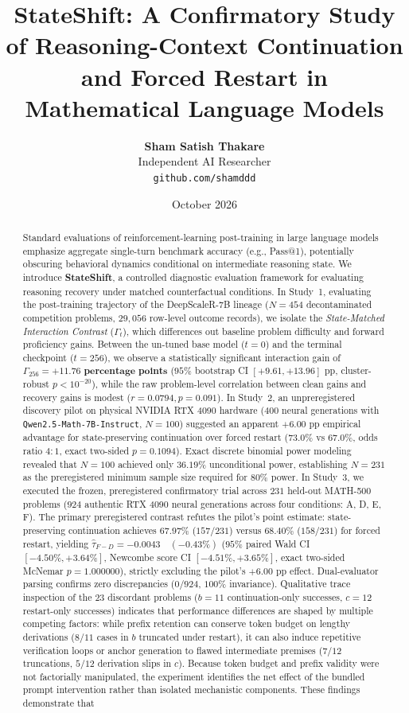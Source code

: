\documentclass[11pt]{article}
\title{\textbf{StateShift: A Confirmatory Study of Reasoning-Context Continuation\\and Forced Restart in Mathematical Language Models}}
\author{
  \textbf{Sham Satish Thakare} \\
  Independent AI Researcher \\
  \texttt{github.com/shamddd} \\
}
\date{October 2026}
\begin{document}
\maketitle

\begin{abstract}
Standard evaluations of reinforcement-learning post-training in large language models emphasize aggregate single-turn benchmark accuracy (e.g., Pass@1), potentially obscuring behavioral dynamics conditional on intermediate reasoning state. We introduce \textbf{StateShift}, a controlled diagnostic evaluation framework for evaluating reasoning recovery under matched counterfactual conditions. In Study~1, evaluating the post-training trajectory of the DeepScaleR-7B lineage ($N=454$ decontaminated competition problems, $29,056$ row-level outcome records), we isolate the \emph{State-Matched Interaction Contrast} ($\Gamma_t$), which differences out baseline problem difficulty and forward proficiency gains. Between the un-tuned base model ($t=0$) and the terminal checkpoint ($t=256$), we observe a statistically significant interaction gain of $\Gamma_{256} = \mathbf{+11.76\text{ percentage points}}$ ($95\%$ bootstrap CI $[+9.61, +13.96]\text{ pp}$, cluster-robust $p < 10^{-20}$), while the raw problem-level correlation between clean gains and recovery gains is modest ($r = 0.0794, p = 0.091$). In Study~2, an unpreregistered discovery pilot on physical NVIDIA RTX 4090 hardware ($400$ neural generations with \texttt{Qwen2.5-Math-7B-Instruct}, $N=100$) suggested an apparent $+6.00\text{ pp}$ empirical advantage for state-preserving continuation over forced restart ($73.0\%$ vs $67.0\%$, odds ratio $4:1$, exact two-sided $p = 0.1094$). Exact discrete binomial power modeling revealed that $N=100$ achieved only $36.19\%$ unconditional power, establishing $N=231$ as the preregistered minimum sample size required for $80\%$ power. In Study~3, we executed the frozen, preregistered confirmatory trial across $231$ held-out MATH-500 problems ($924$ authentic RTX 4090 neural generations across four conditions: A, D, E, F). The primary preregistered contrast refutes the pilot's point estimate: state-preserving continuation achieves $67.97\%$ ($157/231$) versus $68.40\%$ ($158/231$) for forced restart, yielding $\hat{\tau}_{F-D} = \mathbf{-0.0043 \quad (-0.43\%)}$ ($95\%$ paired Wald CI $[-4.50\%, +3.64\%]$, Newcombe score CI $[-4.51\%, +3.65\%]$, exact two-sided McNemar $p = \mathbf{1.000000}$), strictly excluding the pilot's $+6.00\text{ pp}$ effect. Dual-evaluator parsing confirms zero discrepancies ($0/924$, $100\%$ invariance). Qualitative trace inspection of the $23$ discordant problems ($b=11$ continuation-only successes, $c=12$ restart-only successes) indicates that performance differences are shaped by multiple competing factors: while prefix retention can conserve token budget on lengthy derivations ($8/11$ cases in $b$ truncated under restart), it can also induce repetitive verification loops or anchor generation to flawed intermediate premises ($7/12$ truncations, $5/12$ derivation slips in $c$). Because token budget and prefix validity were not factorially manipulated, the experiment identifies the net effect of the bundled prompt intervention rather than isolated mechanistic components. These findings demonstrate that 
\end{abstract}
\end{document}
